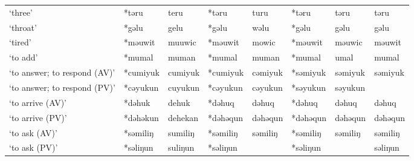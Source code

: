 \begin{landscape}
\begin{longtable}[c]{@{}p{3cm}<{\raggedright}p{2.75cm}<{\raggedright}p{2.75cm}<{\raggedright}p{2.75cm}<{\raggedright}p{2.75cm}<{\raggedright}p{2.75cm}<{\raggedright}p{2.75cm}<{\raggedright}p{2.75cm}<{\raggedright}@{}}
`three'                                              & *təru        & teru                          & *təru          & turu                       & *təru            & təru                     & təru                              \\
`throat'                                             & *gəlu        & gelu                          & *gəlu          & wəlu                       & *gəlu            & gəlu                     & gəlu                              \\
`tired'                                              & *məuwit      & muuwic                        & *məuwit        & mowic                      & *məuwit          & məuwic                   & məuwit                            \\
`to add'                                             & *mumal       & muman                         & *mumal         & muman                      & *mumal           & umal                     & mumal                             \\
`to answer; to respond (AV)'                         & *cumiyuk     & cumiyuk                       & *cumiyuk       & cəmiyuk                    & *səmiyuk         & səmiyuk                  & səmiyuk                           \\
`to answer; to respond (PV)'                         & *cəyukun     & cuyukun                       & *cəyukun       & cəyukun                    & *səyukun         & səyukun                  &                                   \\
`to arrive (AV)'                                     & *dəhuk       & dehuk                         & *dəhuq         & dəhuq                      & *dəhuq           & dəhuq                    & dəhuq                             \\
`to arrive (PV)'                                     & *dəhəkun     & dehekan                       & *dəhəqun       & dəhəqun                    & *dəhəqun         & dəhəqun                  & dəhəqun                           \\
`to ask (AV)'                                        & *səmiliŋ     & sumiliŋ                       & *səmiliŋ       & səmiliŋ                    & *səmiliŋ         & səmiliŋ                  & səmiliŋ                           \\
`to ask (PV)'                                        & *səliŋun     & suliŋun                       & *səliŋun       &                            & *səliŋun         &                          & səliŋun                           \\

\end{longtable}
\end{landscape}
